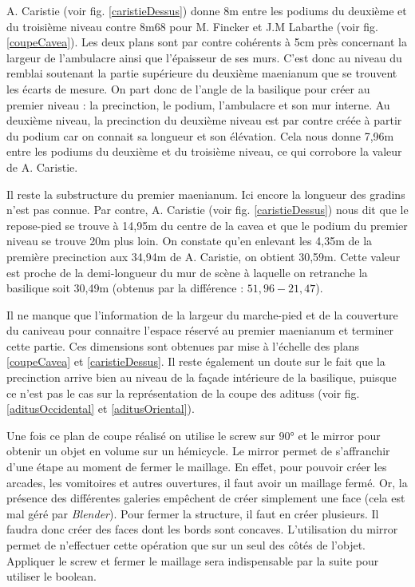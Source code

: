 A. Caristie (voir fig. \ref{caristieDessus}) donne 8m entre les  \glspl{podium} du deuxième et du troisième niveau contre 8m68 pour M. Fincker et J.M Labarthe (voir fig. \ref{coupeCavea}). Les deux plans sont par contre cohérents à 5cm près concernant la largeur de l'\gls{ambulacre} ainsi que l'épaisseur de ses murs. C'est donc au niveau du remblai soutenant la partie supérieure du deuxième \gls{maenianum} que se trouvent les écarts de mesure. On part donc de l'angle de la basilique pour créer au premier niveau : la \gls{precinction}, le \gls{podium}, l'\gls{ambulacre} et son mur interne. Au deuxième niveau, la \gls{precinction} du deuxième niveau est par contre créée à partir du  \gls{podium} car on connait sa longueur et son élévation. Cela nous donne 7,96m entre les \glspl{podium} du deuxième et du troisième niveau, ce qui corrobore la valeur de A. Caristie.

Il reste la substructure du premier \gls{maenianum}. Ici encore la longueur des gradins n'est pas connue. Par contre, A. Caristie (voir fig. \ref{caristieDessus}) nous dit que le repose-pied se trouve à 14,95m du centre de la \gls{cavea} et que le \gls{podium} du premier niveau se trouve 20m plus loin. On constate qu'en enlevant les 4,35m de la première \gls{precinction} aux 34,94m de A. Caristie, on obtient 30,59m. Cette valeur est proche de la demi-longueur du mur de scène à laquelle on retranche la basilique soit 30,49m (obtenus par la différence : $51,96 - 21,47$).


Il ne manque que l'information de la largeur du marche-pied et de la couverture du caniveau pour connaitre l'espace réservé au premier \gls{maenianum} et terminer cette partie. Ces dimensions sont obtenues par mise à l'échelle des plans \ref{coupeCavea} et \ref{caristieDessus}. Il reste également un doute sur le fait que la \gls{precinction} arrive bien au niveau de la façade intérieure de la basilique, puisque ce n'est pas le cas sur la représentation de la coupe des \glspl{aditus} (voir fig. \ref{aditusOccidental} et \ref{aditusOriental}).

Une fois ce plan de coupe réalisé on utilise le \gls{screw} sur 90° et le \gls{mirror} pour obtenir un objet en volume sur un hémicycle. Le \gls{mirror} permet de s'affranchir d'une étape au moment de fermer le maillage. En effet, pour pouvoir créer les arcades, les vomitoires et autres ouvertures, il faut avoir un maillage fermé. Or, la présence des différentes galeries empêchent de créer simplement une face (cela est mal géré par \textit{Blender}). Pour fermer la structure, il faut en créer plusieurs. Il faudra donc créer des faces dont les bords sont concaves. L'utilisation du \gls{mirror} permet de n'effectuer cette opération que sur un seul des côtés de l'objet. Appliquer le \gls{screw} et fermer le maillage sera indispensable par la suite pour utiliser le \gls{boolean}.

